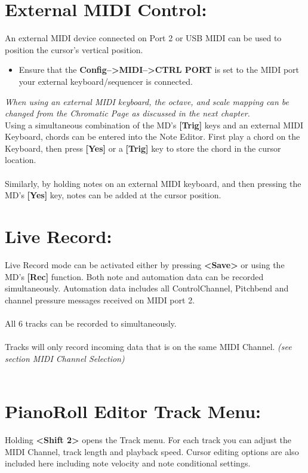 \section{External MIDI Control:}
An external MIDI device connected on Port 2 or USB MIDI can be used to position the cursor's vertical position.
\begin{itemize}
    \item Ensure that the \textbf{Config-->MIDI-->CTRL PORT} is set to the MIDI port your external keyboard/sequencer is connected.
\end{itemize}
\textit{When using an external MIDI keyboard, the octave, and scale mapping can be changed from the Chromatic Page as discussed in the next chapter.}\\

Using a simultaneous combination of the MD's \textbf{[Trig]} keys and an external MIDI Keyboard, chords can be entered into the Note Editor. First play a chord on the Keyboard, then press \textbf{[Yes]} or a \textbf{[Trig]} key to store the chord in the cursor location.
\\\\
Similarly, by holding notes on an external MIDI keyboard, and then pressing the MD's \textbf{[Yes]} key, notes can be added at the cursor position.
\section{Live Record:}
Live Record mode can be activated either by pressing  \textbf{<Save>} or using the MD's \textbf{[Rec]} function. Both note and automation data can be recorded simultaneously. Automation data includes all ControlChannel, Pitchbend and channel pressure messages received on MIDI port 2.\\\\All 6 tracks can be recorded to simultaneously.\\
\\Tracks will only record incoming data that is on the same MIDI Channel. \textit{(see section MIDI Channel Selection)}\\\\

\newpage
\section{PianoRoll Editor Track Menu:}
Holding \textbf{<Shift 2>} opens the Track menu. For each track you can adjust the MIDI Channel, track length and playback speed. Cursor editing options are also included here including note velocity and note conditional settings.

